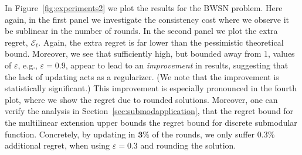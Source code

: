 In Figure~\ref{fig:experiments2} we plot the results for the BWSN problem. Here again, in the first panel we investigate the consistency cost where we observe it be sublinear in the number of rounds. In the second panel we plot the extra regret, $\mathcal{E}_t$. Again, the extra regret is far lower than the pessimistic theoretical bound. Moreover, we see that sufficiently high, but bounded away from 1, values of $\varepsilon$, e.g.,  $\varepsilon = 0.9$, appear to lead to an {\em improvement} in results, suggesting that the lack of updating acts as a regularizer. (We note that the improvement is statistically significant.) This improvement is especially pronounced in the fourth plot, where we show the regret due to rounded solutions. Moreover, one can verify the analysis in Section~\ref{sec:submodapplication}, that the regret bound for the multilinear extension upper bounds the regret bound for discrete submodular function. Concretely, by updating in $\mathbf{3\%}$ of the rounds, we only suffer $\mathbf{0.3\%}$ additional regret, when using $\varepsilon = 0.3$ and rounding the solution.


